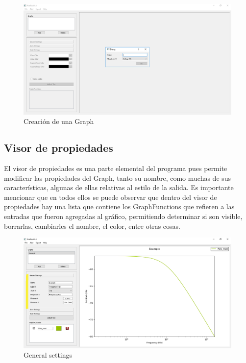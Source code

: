 \documentclass[a4paper,10pt]{article}
\begin{document}
\begin{figure}[H]
\begin{center}
	\includegraphics[scale=0.5]{resources/example_create_plotter.png}
	\caption{Creaci\'on de una Graph}
\end{center}
\end{figure}

\subsection{Visor de propiedades}
El visor de propiedades es una parte elemental del programa pues permite modificar las propiedades del Graph, tanto su nombre, como muchas de sus caracter\'isticas, algunas de ellas relativas al estilo de la salida. Es importante mencionar que en todos ellos se puede observar que dentro del visor de propiedades hay una lista que contiene los GraphFunctions que refieren a las entradas que fueron agregadas al gr\'afico, permitiendo determinar si son visible, borrarlas, cambiarles el nombre, el color, entre otras cosas.

\begin{figure}[H]
\begin{center}
	\includegraphics[scale=0.5]{resources/visor_general.png}
	\caption{General settings}
\end{center}
\end{figure}
\end{document}
